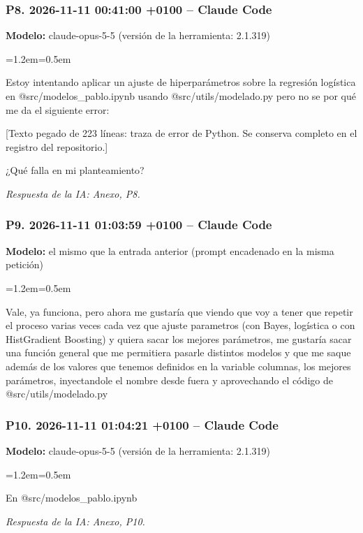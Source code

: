 \documentclass[11pt,a4paper]{article}
\newenvironment{prompt}
  {\par\smallskip\begin{list}{}{\leftmargin=1.2em\rightmargin=0.5em}\item\relax\small\color{black!80}}
  {\end{list}\smallskip}
\begin{document}
\subsubsection*{P8. 2026-11-11 00:41:00 +0100 -- Claude Code}
\textbf{Modelo:} claude-opus-5-5 (versión de la herramienta: 2.1.319)

\begin{prompt}
Estoy intentando aplicar un ajuste de hiperparámetros sobre la regresión logística en @src/\allowbreak{}modelos\_\allowbreak{}pablo.ipynb  usando @src/\allowbreak{}utils/\allowbreak{}modelado.py   pero no se por qué me da el siguiente error:

[Texto pegado de 223 líneas: traza de error de Python. Se conserva completo en el registro del repositorio.]

¿Qué falla en mi planteamiento?
\end{prompt}

\textit{Respuesta de la IA: Anexo, P8.}

\subsubsection*{P9. 2026-11-11 01:03:59 +0100 -- Claude Code}
\textbf{Modelo:} el mismo que la entrada anterior (prompt encadenado en la misma petición)

\begin{prompt}
Vale, ya funciona, pero ahora me gustaría que viendo que voy a tener que repetir el proceso varias veces cada vez que ajuste parametros (con Bayes, logística o con HistGradient Boosting) y quiera sacar los mejores parámetros, me gustaría sacar una función general que me permitiera pasarle distintos modelos y que me saque además de los valores que tenemos definidos en la variable columnas, los mejores parámetros, inyectandole el nombre desde fuera y aprovechando el código de @src/\allowbreak{}utils/\allowbreak{}modelado.py
\end{prompt}

\subsubsection*{P10. 2026-11-11 01:04:21 +0100 -- Claude Code}
\textbf{Modelo:} claude-opus-5-5 (versión de la herramienta: 2.1.319)

\begin{prompt}
En @src/\allowbreak{}modelos\_\allowbreak{}pablo.ipynb
\end{prompt}

\textit{Respuesta de la IA: Anexo, P10.}
\end{document}

